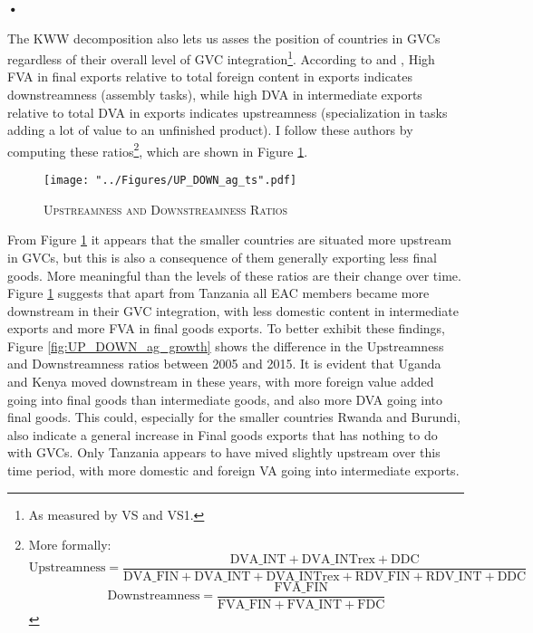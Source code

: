 \textbf{\textbf{•}}\documentclass[a4paper]{article}
\begin{document}
The KWW decomposition also lets us asses the position of countries in GVCs regardless of their overall level of GVC integration\footnote{As measured by VS and VS1.}. According to \citet{Kummritz20162} and \citet{Wang2014}, High FVA in final exports relative to total foreign content in exports indicates downstreamness (assembly tasks), while high DVA in intermediate exports relative to total DVA in exports indicates upstreamness (specialization in tasks adding a lot of value to an unfinished product). I follow these authors by computing these ratios\footnote{More formally: $$\text{Upstreamness} = \frac{\text{DVA\_INT} + \text{DVA\_INTrex} + \text{DDC}}{\text{DVA\_FIN} + \text{DVA\_INT} + \text{DVA\_INTrex} + \text{RDV\_FIN} + \text{RDV\_INT} + \text{DDC}}$$  
$$\text{Downstreamness} = \frac{\text{FVA\_FIN}}{\text{FVA\_FIN} + \text{FVA\_INT} + \text{FDC}}$$}, which are shown in Figure \ref{fig:UP_DOWN_ag_ts}.


\begin{figure}[h!]
\centering
\caption{\label{fig:UP_DOWN_ag_ts}\textsc{Upstreamness and Downstreamness Ratios}}
\texttt{[image: "../Figures/UP\_DOWN\_ag\_ts".pdf]} %
\end{figure}
\FloatBarrier

From Figure \ref{fig:UP_DOWN_ag_ts} it appears that the smaller countries are situated more upstream in GVCs, but this is also a consequence of them generally exporting less final goods. More meaningful than the levels of these ratios are their change over time. Figure \ref{fig:UP_DOWN_ag_ts} suggests that apart from Tanzania all EAC members became more downstream in their GVC integration, with less domestic content in intermediate exports and more FVA in final goods exports. To better exhibit these findings, Figure \ref{fig:UP_DOWN_ag_growth} shows the difference in the Upstreamness and Downstreamness ratios between 2005 and 2015. It is evident that Uganda and Kenya moved downstream in these years, with more foreign value added going into final goods than intermediate goods, and also more DVA going into final goods. This could, especially for the smaller countries Rwanda and Burundi, also indicate a general increase in Final goods exports that has nothing to do with GVCs. Only Tanzania appears to have mived slightly upstream over this time period, with more domestic and foreign VA going into intermediate exports. 
\end{document}
